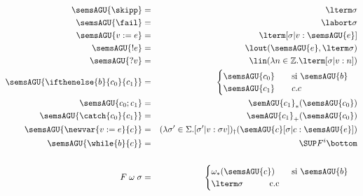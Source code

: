       \begin{multicols}{2}
        \begin{eqnarray*}
          \semsAGU{\skipp} &=& \lterm \sigma \\
          \semsAGU{\fail} &=& \labort \sigma \\
          \semsAGU{v := e} &=& \lterm [\sigma | v : \semsAGU{e}] \\
          \semsAGU{!e} &=& \lout(\semsAGU{e}, \lterm \sigma) \\
          \semsAGU{?v} &=& \lin(\lambda n \in \mathbb{Z}. \lterm [\sigma | v : n]) \\
          \semsAGU{\ifthenelse{b}{c_{0}}{c_{1}}} &=& \begin{cases}
            \semsAGU{c_0} \qquad \text{si } \semsAGU{b} \\
            \semsAGU{c_1} \qquad c.c \\
          \end{cases}\\
          \semsAGU{c_{0};c_{1}} &=& \semAGU{c_1}_{\ast} (\semsAGU{c_0}) \\
          \semsAGU{\catch{c_0}{c_1}} &=& \semAGU{c_1}_{+} (\semsAGU{c_0}) \\
          \semsAGU{\newvar{ v:=e}{c}} &=& (\lambda \sigma' \in \Sigma. [\sigma' | v:\sigma v])_{\dag} (\semAGU{c}[\sigma|c:\semsAGU{e}]) \\
          \semsAGU{\while{b}{c}} &=& \SUP F^{i} \bottom \\ \\
          F \;\omega\;\sigma &=& \begin{cases}
            \omega_{\ast}(\semsAGU{c}) \qquad \text{si } \semsAGU{b} \\
            \lterm \sigma \qquad\;\;\;\; \text{c.c}
            \end{cases}
          \\ \\ 
        \end{eqnarray*}


\end{multicols}
